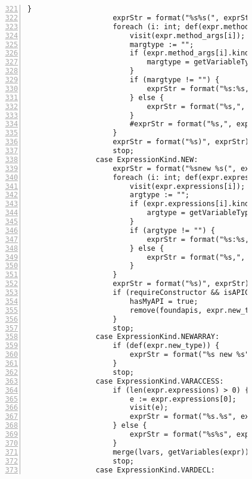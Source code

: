 \begin{figure}[ht!]
\begin{lstlisting}[numbers=left, tabsize=4, escapechar=@, caption={API Usage Mining Analysis},label={lst:aun-code},  firstline = 321, firstnumber = 321, lastline = 381]
                    }
                    exprStr = format("%s%s(", exprStr, expr.method);
                    foreach (i: int; def(expr.method_args[i])) {
                        visit(expr.method_args[i]);  
                        margtype := "";
                        if (expr.method_args[i].kind == ExpressionKind.VARACCESS) {
                            margtype = getVariableType(expr.method_args[i].variable, false);
                        }
                        if (margtype != "") {
                            exprStr = format("%s:%s,", exprStr, margtype);
                        } else {
                            exprStr = format("%s,", exprStr);    
                        }
                        #exprStr = format("%s,", exprStr);
                    }
                    exprStr = format("%s)", exprStr);
                    stop;
                case ExpressionKind.NEW:
                    exprStr = format("%snew %s(", exprStr, expr.new_type.name);
                    foreach (i: int; def(expr.expressions[i])) {
                        visit(expr.expressions[i]);  
                        argtype := "";
                        if (expr.expressions[i].kind == ExpressionKind.VARACCESS) {
                            argtype = getVariableType(expr.expressions[i].variable, false);
                        }
                        if (argtype != "") {
                            exprStr = format("%s:%s,", exprStr, argtype);
                        } else {
                            exprStr = format("%s,", exprStr);    
                        }
                    }
                    exprStr = format("%s)", exprStr);
                    if (requireConstructor && isAPIConstructor(expr.new_type.name)) {
                        hasMyAPI = true;
                        remove(foundapis, expr.new_type.name);
                    }
                    stop;
                case ExpressionKind.NEWARRAY:
                    if (def(expr.new_type)) {
                        exprStr = format("%s new %s", exprStr, expr.new_type.name);
                    }
                    stop;
                case ExpressionKind.VARACCESS:
                    if (len(expr.expressions) > 0) {
                        e := expr.expressions[0];
                        visit(e);
                        exprStr = format("%s.%s", exprStr, expr.variable);
                    } else {
                        exprStr = format("%s%s", exprStr, expr.variable);
                    }
                    merge(lvars, getVariables(expr));
                    stop;
                case ExpressionKind.VARDECL:

\end{lstlisting}
\end{figure}
